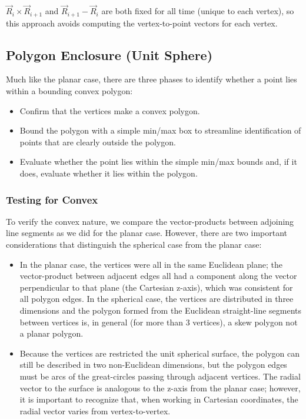 \documentclass[11pt,fleqn]{report}
\begin{document}
$\vec R_i \times \vec R_{i+1}$ and $\vec R_{i+1} - \vec R_i$ are both fixed
for all time (unique to each vertex), so this approach avoids
computing the vertex-to-point vectors for each vertex.

\subsection{Polygon Enclosure (Unit Sphere)}
Much like the planar case, there are three phases to identify whether a
point lies within a bounding convex polygon:
\begin{itemize}
  \item Confirm that the vertices make a convex polygon.
  \item Bound the polygon with a simple min/max box to streamline
    identification of points that are clearly outside the polygon.
  \item Evaluate whether the point lies within the simple min/max bounds and,
    if it does, evaluate whether it lies within the polygon.
\end{itemize}

\subsubsection{Testing for Convex}

To verify the convex nature, we compare the vector-products between adjoining
line segments as we did for the planar case. However, there are two
important considerations that distinguish the spherical case from the planar
case:
\begin{itemize}
  \item In the planar case, the vertices were all in the same Euclidean plane;
    the vector-product between adjacent edges all had a component along the
    vector perpendicular to that plane (the Cartesian z-axis), which was
    consistent for all polygon edges.
    In the spherical case, the vertices are distributed in three dimensions
    and the polygon formed from the Euclidean straight-line segments
    between vertices is, in general (for more than 3 vertices), a skew
    polygon not a planar polygon.
  \item Because the vertices are restricted the unit spherical surface, the
    polygon can still be described in two non-Euclidean dimensions,
    but the polygon edges
    must be arcs of the great-circles passing through adjacent vertices.
    The radial vector to the surface is analogous to the z-axis from the
    planar case; however, it is important to recognize that, when working
    in Cartesian coordinates, the radial vector varies from vertex-to-vertex.
\end{itemize}
\end{document}
